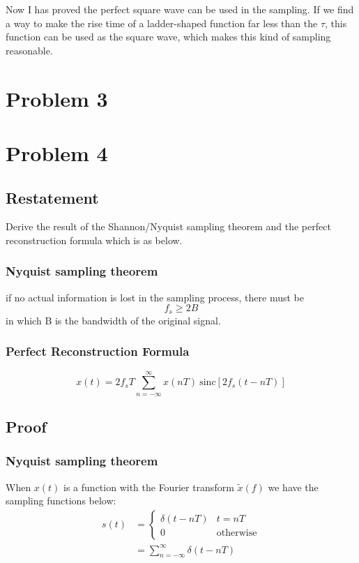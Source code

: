 \documentclass{article}
\begin{document}
Now I has proved the perfect square wave can be used in the sampling. If we find a way to make the rise time of a ladder-shaped function far less than the $\tau$, this function can be used as the square wave, which makes this kind of sampling reasonable.


\section{Problem 3}

\section{Problem 4}
\subsection{Restatement}
Derive the result of the Shannon/Nyquist sampling theorem and the perfect reconstruction formula which is as below.
\subsubsection*{Nyquist sampling theorem}

if no actual information is lost in the sampling process, there must be
\begin{equation}
    f_s \geq 2B
\end{equation}
in which B is the bandwidth of the original signal.

\subsubsection*{Perfect Reconstruction Formula}
\begin{equation}
    x(t) = 2f_s T \sum_{n = -\infty}^{\infty} x(nT) ~ \mathrm{sinc} \left[ 2f_s (t - nT) \right]
\end{equation}
\subsection{Proof}
\subsubsection*{Nyquist sampling theorem}

When $x(t)$ is a function with the Fourier transform $\widetilde{x}(f)$
we have the sampling functions below:
\begin{align}
    s(t) &= 
    \left\{ 
        \begin{array}{lr}
            \delta(t - nT) & t = nT\\
            0 & \mathrm{otherwise}
        \end{array}
    \right. \nonumber \\
    &= \sum_{n = -\infty}^{\infty} \delta(t - nT)
\end{align}
\end{document}
